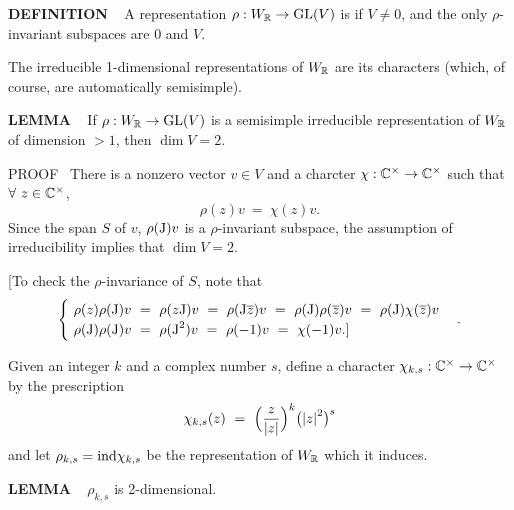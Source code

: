 \begin{x}{\small\bf DEFINITION} \ %
A representation $\rho:W_{\mathbb{R}} \rightarrow \text{GL}(V)$ is 
if $V \neq 0$, 
and the only $\rho$-invariant subspaces are 0 and $V$.
\end{x}

\vspace{0.1cm}

The irreducible 1-dimensional representations of $W_{\mathbb{R}}$ are its characters (which, of course, are automatically semisimple).

\vspace{0.1cm}

\begin{x}{\small\bf LEMMA} \ %
If $\rho:W_{\mathbb{R}} \rightarrow \text{GL}(V)$ is a semisimple irreducible representation of $W_{\mathbb{R}}$ of dimension $> 1$, then $\dim V = 2$.

\vspace{0.1cm}

PROOF \ 
There is a nonzero vector $v \in V$ and a charcter $\chi:\mathbb{C}^\times \rightarrow \mathbb{C}^\times$ such that $\forall \ z \in \mathbb{C}^\times$, 
\[
\rho(z) v \ = \ \chi(z) v.
\]
Since the span $S$ of $v$, $\rho(\text{J})v$ is a $\rho$-invariant subspace, the assumption of irreducibility implies that $\dim V = 2$.

[To check the $\rho$-invariance of $S$, note that 
\[
\begin{cases}
 \ \rho(z) \rho(\tJ)v \ = \ \rho(z\tJ)v  \ = \ \rho(\tJ\ov{z})v \ = \ \rho(\tJ) \rho(\ov{z}) v \ = \ \rho(\tJ)\chi(\ov{z}) v\\
 \ \rho(\tJ) \rho(\tJ)v \ = \ \rho(\tJ^2) v \ = \ \rho(-1)v \ = \ \chi(-1) v.]
\end{cases}
.
\]

\vspace{0.1cm}

Given an integer $k$ and a complex number $s$, define a character $\chi_{k,s}:\mathbb{C}^\times \rightarrow \mathbb{C}^\times$ by the prescription
\[
\chi_{k,s}(z) \ = \ \Bigl(\frac{z}{\abs{z}}\Bigr)^k \bigl(\abs{z}^2 \bigr)^s
\]
and let $\rho_{k,s} = \text{ind} \chi_{k,s}$ be the representation of $W_{\mathbb{R}}$ which it induces.
\end{x}

\vspace{0.1cm}

\begin{x}{\small\bf LEMMA} \ %
$\rho_{k,s}$ is 2-dimensional.
\end{x}

